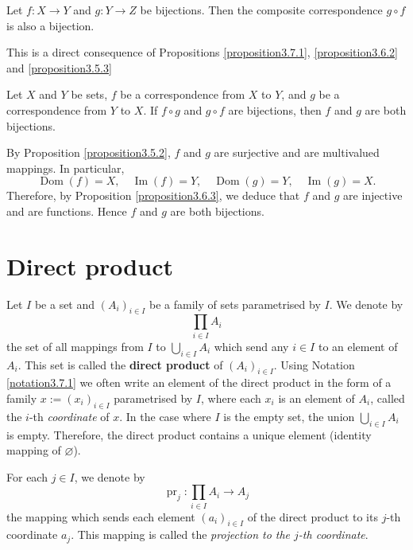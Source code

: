 \begin{propositionenv}\label{proposition3.8.2}
    Let \( f: X \to Y \) and \( g: Y \to Z \) be bijections. Then the composite correspondence \( g \circ f \) is also a bijection.

\end{propositionenv}

\begin{proofenv}
    This is a direct consequence of Propositions \ref{proposition3.7.1},  \ref{proposition3.6.2} and \ref{proposition3.5.3}

\end{proofenv}

\begin{propositionenv}\label{proposition3.8.3}
    Let \( X \) and \( Y \) be sets,  \( f \) be a correspondence from \( X \) to \( Y \),  and \( g \) be a correspondence from \( Y \) to \( X \). If \( f \circ g \) and \( g \circ f \) are bijections,  then \( f \) and \( g \) are both bijections.

\end{propositionenv}

\begin{proofenv}
    By Proposition \ref{proposition3.5.2},  \( f \) and \( g \) are surjective and are multivalued mappings. In particular, 
\[
\operatorname{Dom}(f) = X,  \quad \operatorname{Im}(f) = Y,  \quad \operatorname{Dom}(g) = Y,  \quad \operatorname{Im}(g) = X.
\]
Therefore,  by Proposition \ref{proposition3.6.3},  we deduce that \( f \) and \( g \) are injective and are functions. Hence \( f \) and \( g \) are both bijections. 

\end{proofenv}

\section{Direct product}
\label{sec:direct-product}

\begin{definitionenv}
Let $I$ be a set and $(A_i)_{i \in I}$ be a family of sets parametrised by $I$. We denote by
\[
\prod_{i \in I} A_i
\]
the set of all mappings from $I$ to $\bigcup_{i \in I} A_i$ which send any $i \in I$ to an element of $A_i$. This set is called the \textbf{direct product} of $(A_i)_{i \in I}$. Using Notation \ref{notation3.7.1} we often write an element of the direct product in the form of a family $x := (x_i)_{i \in I}$ parametrised by $I$,  where each $x_i$ is an element of $A_i$,  called the $i$-th \emph{coordinate} of $x$. In the case where $I$ is the empty set,  the union $\bigcup_{i \in I} A_i$ is empty. Therefore,  the direct product contains a unique element (identity mapping of $\varnothing$).

For each $j \in I$,  we denote by
\[
\operatorname{pr}_j : \prod_{i \in I} A_i \longrightarrow A_j
\]
the mapping which sends each element $(a_i)_{i \in I}$ of the direct product to its $j$-th coordinate $a_j$. This mapping is called the \emph{projection to the $j$-th coordinate}.
\end{definitionenv}


